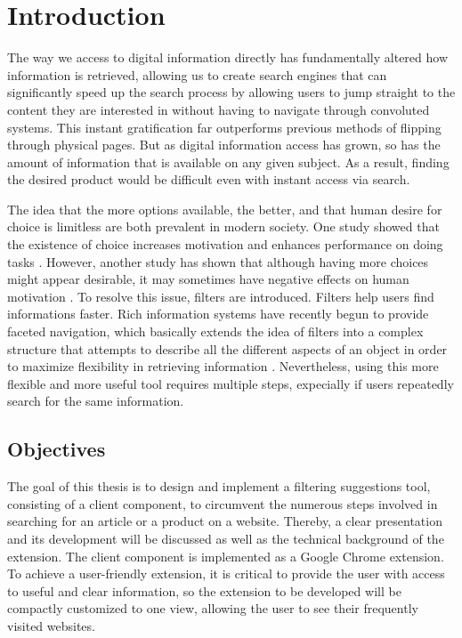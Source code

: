 \newpage
\chapter{Introduction}
The way we access to digital information directly has fundamentally altered how information is retrieved, allowing us to create search engines that can significantly speed up the search process by allowing users to jump straight to the content they are interested in without having to navigate through convoluted systems. This instant gratification far outperforms previous methods of flipping through physical pages. But as digital information access has grown, so has the amount of information that is available on any given subject. As a result, finding the desired product would be difficult even with instant access via search.

The idea that the more options available, the better, and that human desire for choice is limitless are both prevalent in modern society. One study showed that the existence of choice increases motivation and enhances performance on doing tasks \autocite{zuckerman1978importance}. However, another study has shown that although having more choices might appear desirable, it may sometimes have negative effects on human motivation \autocite{iyengar2000choice}. To resolve this issue, filters are introduced. Filters help users find informations faster. Rich information systems have recently begun to provide faceted navigation, which basically extends the idea of filters into a complex structure that attempts to describe all the different aspects of an object in order to maximize flexibility in retrieving information \autocite{whitenton2014filters}. Nevertheless, using this more flexible and more useful tool requires multiple steps, expecially if users repeatedly search for the same information.

\section{Objectives}
The goal of this thesis is to design and implement a filtering suggestions tool, consisting of a client component, to circumvent the numerous steps involved in searching for an article or a product on a website. Thereby, a clear presentation and its development will be discussed as well as the technical background of the extension. The client component is implemented as a Google Chrome extension. To achieve a user-friendly extension, it is critical to provide the user with access to useful and clear information, so the extension to be developed will be compactly customized to one view, allowing the user to see their frequently visited websites.


